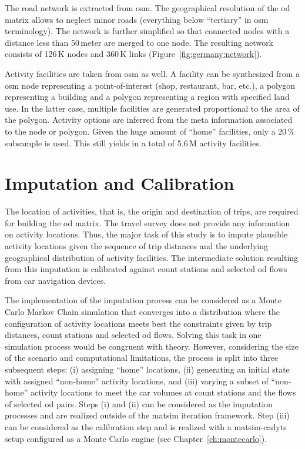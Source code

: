 The road network is extracted from \gls{osm}. The geographical resolution of the \gls{od} matrix allows to neglect minor roads (everything below ``tertiary'' in \gls{osm} terminology). The network is further simplified so that connected nodes with a distance less than 50\,meter are merged to one node. The resulting network consists of 126\,K nodes and 360\,K links (Figure~\ref{fig:germany:network}).

Activity facilities are taken from \gls{osm} as well. A facility can be synthesized from a \gls{osm} node representing a point-of-interest (shop, restaurant, bar, etc.), a polygon representing a building and a polygon representing a region with specified land use. In the latter case, multiple facilities are generated proportional to the area of the polygon. Activity options are inferred from the meta information associated to the node or polygon. Given the huge amount of ``home'' facilities, only a 20\,\% subsample is used. This still yields in a total of 5.6\,M activity facilities.

\section{Imputation and Calibration}

The location of activities, that is, the origin and destination of trips, are required for building the \gls{od} matrix. The travel survey does not provide any information on activity locations. Thus, the major task of this study is to impute plausible activity locations given the sequence of trip distances and the underlying geographical distribution of activity facilities. The intermediate solution resulting from this imputation is calibrated against count stations and selected \gls{od} flows from car navigation devices.

The implementation of the imputation process can be considered as a Monte Carlo Markov Chain simulation that converges into a distribution where the configuration of activity locations meets best the constraints given by trip distances, count stations and selected \gls{od} flows. Solving this task in one simulation process would be congruent with theory. However, considering the size of the scenario and computational limitations, the process is split into three subsequent steps: (i) assigning ``home'' locations, (ii) generating an initial state with assigned ``non-home'' activity locations, and (iii) varying a subset of ``non-home'' activity locations to meet the car volumes at count stations and the flows of selected \gls{od} pairs. Steps (i) and (ii) can be considered as the imputation processes and are realized outside of the \gls{matsim} iteration framework. Step (iii) can be considered as the calibration step and is realized with a \gls{matsim}-\gls{cadyts} setup configured as a Monte Carlo engine (see Chapter~\ref{ch:montecarlo}).

